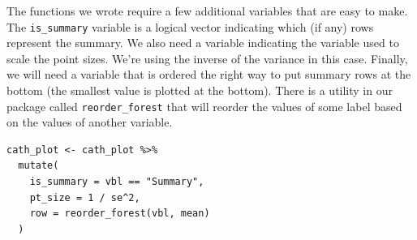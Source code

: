 The functions we wrote require a few additional variables that are easy to make. The \texttt{is\_summary} variable is a logical vector indicating which (if any) rows represent the summary. We also need a variable indicating the variable used to scale the point sizes. We're using the inverse of the variance in this case. Finally, we will need a variable that is ordered the right way to put summary rows at the bottom (the smallest value is plotted at the bottom). There is a utility in our package called \texttt{reorder\_forest} that will reorder the values of some label based on the values of another variable.

\begin{verbatim}
cath_plot <- cath_plot %>%
  mutate(
    is_summary = vbl == "Summary",
    pt_size = 1 / se^2,
    row = reorder_forest(vbl, mean)
  )
\end{verbatim}


